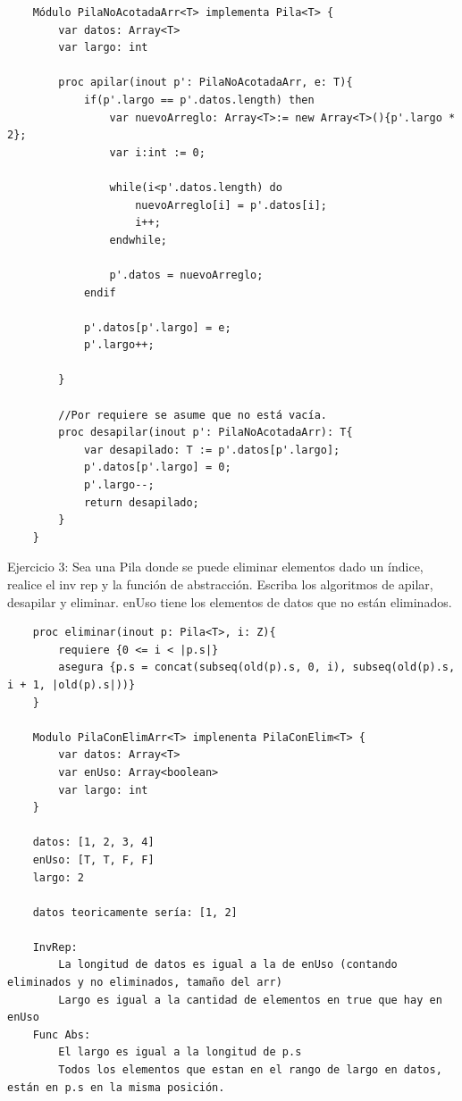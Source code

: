\documentclass[10pt,a4paper]{article}
\begin{document}
\begin{lstlisting}
    Módulo PilaNoAcotadaArr<T> implementa Pila<T> {
        var datos: Array<T>
        var largo: int

        proc apilar(inout p': PilaNoAcotadaArr, e: T){
            if(p'.largo == p'.datos.length) then
                var nuevoArreglo: Array<T>:= new Array<T>(){p'.largo * 2};
                var i:int := 0;
                
                while(i<p'.datos.length) do
                    nuevoArreglo[i] = p'.datos[i];
                    i++;
                endwhile;
                
                p'.datos = nuevoArreglo;
            endif
              
            p'.datos[p'.largo] = e;
            p'.largo++;

        }

        //Por requiere se asume que no está vacía.
        proc desapilar(inout p': PilaNoAcotadaArr): T{
            var desapilado: T := p'.datos[p'.largo];
            p'.datos[p'.largo] = 0; 
            p'.largo--;
            return desapilado;
        }
    }
\end{lstlisting}
Ejercicio 3: Sea una Pila donde se puede eliminar elementos dado un índice, realice el inv rep y la función de abstracción. Escriba los algoritmos de apilar, desapilar y eliminar. enUso tiene los elementos de datos que no están eliminados.
\begin{lstlisting}
    proc eliminar(inout p: Pila<T>, i: Z){
        requiere {0 <= i < |p.s|}
        asegura {p.s = concat(subseq(old(p).s, 0, i), subseq(old(p).s, i + 1, |old(p).s|))}
    }

    Modulo PilaConElimArr<T> implenenta PilaConElim<T> {
        var datos: Array<T>
        var enUso: Array<boolean>
        var largo: int
    }

    datos: [1, 2, 3, 4] 
    enUso: [T, T, F, F]
    largo: 2

    datos teoricamente sería: [1, 2]
    
    InvRep: 
        La longitud de datos es igual a la de enUso (contando eliminados y no eliminados, tamaño del arr)
        Largo es igual a la cantidad de elementos en true que hay en enUso
    Func Abs:
        El largo es igual a la longitud de p.s
        Todos los elementos que estan en el rango de largo en datos, están en p.s en la misma posición.
\end{lstlisting}
\end{document}
